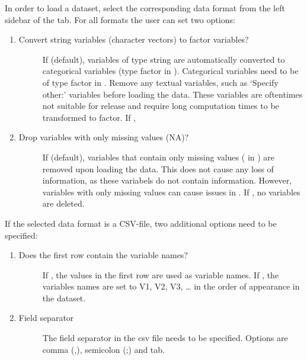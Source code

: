 \documentclass[letterpaper,10pt,english]{sphinxmanual}
\begin{document}
In order to load a dataset, select the corresponding data format
from the left sidebar of the  tab. For all formats the user can set two options:
\begin{enumerate}
\item {} \begin{description}
\item[{Convert string variables (character vectors) to factor variables?}] \leavevmode
If  (default), variables of type string are automatically converted to categorical variables
(type factor in ). Categorical variables need to be of type factor in .
Remove any textual variables, such as ‘Specify other:’ variables before loading the
data. These variables are oftentimes not suitable for release and require long
computation times to be transformed to factor. If ,

\end{description}

\item {} \begin{description}
\item[{Drop variables with only missing values (NA)?}] \leavevmode
If  (default), variables that contain only missing values ( in )
are removed upon loading the data. This does not cause any loss of information,
as these variabels do not contain information. However, variables with only
missing values can cause issues in . If , no variables are deleted.

\end{description}

\end{enumerate}

If the selected data format is a CSV-file, two additional options need to be specified:
\begin{enumerate}
\item {} \begin{description}
\item[{Does the first row contain the variable names?}] \leavevmode
If , the values in the first row are used as variable names. If
, the variables names are set to V1, V2, V3, … in the order of
appearance in the dataset.

\end{description}

\item {} \begin{description}
\item[{Field separator}] \leavevmode
The field separator in the csv file needs to be specified. Options are comma (,),
semicolon (;) and tab.

\end{description}

\end{enumerate}
\end{document}
